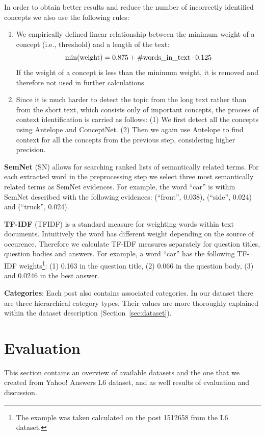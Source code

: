 \documentclass[conference]{IEEEtran}
\newcommand{\secref}[1]{Section~\ref{#1}}
\begin{document}
In order to obtain better results and reduce the number of incorrectly identified concepts we also use the following rules:
\begin{enumerate}
	\item We empirically defined linear relationship between the minimum weight of a concept (i.e., threshold) and a length of the text:
$$
	{\rm min(weight)} = 0.875 + {\rm \#words\_in\_text} \cdot 0.125
$$
If the weight of a concept is less than the minimum weight, it is removed and therefore not used in further calculations.
	\item Since it is much harder to detect the topic from the long text rather than from the short text, which consists only of important concepts, the process of context identification is carried as follows: (1) We first detect all the concepts using Antelope and ConceptNet. (2) Then we again use Antelope to find context for all the concepts from the previous step, considering higher precision.
\end{enumerate}

{\bf SemNet} (SN) allows for searching ranked lists of semantically related terms. For each extracted word in the preprocessing step we select three most semantically related terms as SemNet evidences. For example, the word ``car'' is within SemNet described with the following evidences: (``front'', 0.038), (``side'', 0.024) and (``truck'', 0.024).

{\bf TF-IDF} (TFIDF) is a standard measure for weighting words within text documents. Intuitively the word has different weight depending on the source of occurence. Therefore we calculate TF-IDF measures separately for question titles, question bodies and answers. For example, a word ``car'' has the following TF-IDF weights\footnote{The example was taken calculated on the post 1512658 from the L6 dataset.}: (1) 0.163 in the question title, (2) 0.066 in the question body, (3) and 0.0246 in the best answer. 

{\bf Categories}:
Each post also contains associated categories. In our dataset there are three hierarchical category types. Their values are more thoroughly explained within the dataset description (\secref{sec:dataset}).


\section{Evaluation}
This section contains an overview of available datasets and the one that we created from Yahoo! Answers L6 dataset, and as well results of evaluation and discussion.
\end{document}
